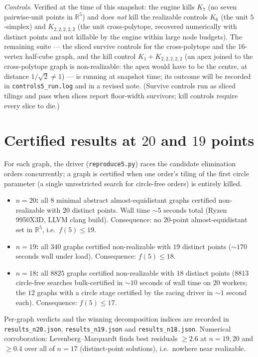\documentclass[11pt]{article}
\newcommand{\R}{\mathbb{R}}
\begin{document}
\emph{Controls.} Verified at the time of this snapshot: the engine kills
$K_7$ (no seven pairwise-unit points in $\R^5$) and does \emph{not} kill
the realizable controls $K_6$ (the unit $5$-simplex) and $K_{2,2,2,2,2}$
(the unit cross-polytope, recovered numerically with distinct points and
not killable by the engine within large node budgets). The remaining suite
--- the sliced survive controls for the cross-polytope and the $16$-vertex
half-cube graph, and the kill control $K_1+K_{2,2,2,2,2}$ (an apex joined
to the cross-polytope graph is non-realizable: the apex would have to be
the centre, at distance $1/\sqrt2\ne1$) --- is running at snapshot time;
its outcome will be recorded in \texttt{controls5\_run.log} and in a
revised note. (Survive controls run as sliced tilings and pass when slices
report floor-width survivors; kill controls require every slice to die.)

\section*{Certified results at $20$ and $19$ points}

For each graph, the driver (\texttt{reproduce5.py}) races the candidate
elimination orders concurrently; a graph is certified when one order's
tiling of the first circle parameter (a single unrestricted search for
circle-free orders) is entirely killed.

\begin{itemize}
\item \textbf{$n=20$:} all $8$ minimal abstract almost-equidistant graphs
      certified non-realizable with $20$ distinct points. Wall time
      ${\sim}5$ seconds total (Ryzen 9950X3D, LLVM clang build).
      Consequence: no $20$-point almost-equidistant set in $\R^5$, i.e.\
      $f(5)\le 19$.
\item \textbf{$n=19$:} all $340$ graphs certified non-realizable with
      $19$ distinct points (${\sim}170$ seconds wall under load).
      Consequence: $f(5)\le 18$.
\item \textbf{$n=18$:} all $8825$ graphs certified non-realizable with
      $18$ distinct points ($8813$ circle-free searches bulk-certified in
      ${\sim}10$ seconds of wall time on $20$ workers; the $12$ graphs
      with a circle stage certified by the racing driver in ${\sim}1$
      second each). Consequence: \textbf{$f(5)\le 17$}.
\end{itemize}

Per-graph verdicts and the winning decomposition indices are recorded in
\texttt{results\_n20.json}, \texttt{results\_n19.json} and
\texttt{results\_n18.json}. Numerical corroboration: Levenberg--Marquardt
finds best residuals $\ge 2.6$ at $n=19,20$ and $\ge 0.4$ over all of
$n=17$ (distinct-point solutions), i.e.\ nowhere near realizable.
\end{document}
